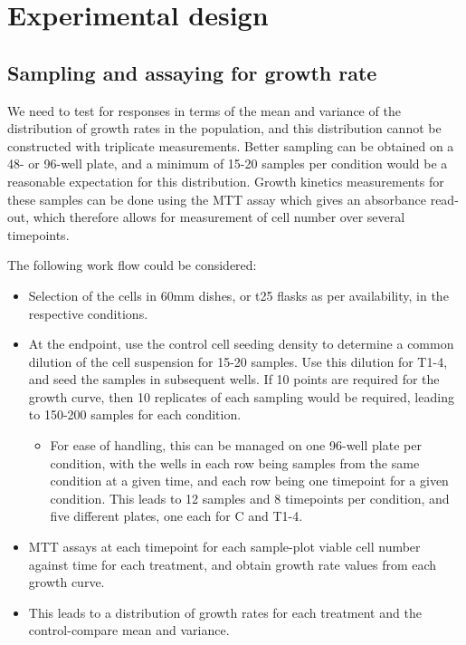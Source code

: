 \documentclass[12pt, letterpaper, onecolumn]{article}
\begin{document}
	\section{Experimental design}
	
	\subsection{Sampling and assaying for growth rate}
	We need to test for responses in terms of the mean and variance of the distribution of growth rates in the population, and this distribution cannot be constructed with triplicate measurements. Better sampling can be obtained on a 48- or 96-well plate, and a minimum of 15-20 samples per condition would be a reasonable expectation for this distribution. Growth kinetics measurements for these samples can be done using the MTT assay which gives an absorbance read-out, which therefore allows for measurement of cell number over several timepoints.
	
	
	The following work flow could be considered:
	\begin{itemize}
		\item Selection of the cells in 60mm dishes, or t25 flasks as per availability, in the respective conditions.
		\item At the endpoint, use the control cell seeding density to determine a common dilution of the cell suspension for 15-20 samples. Use this dilution for T1-4, and seed the samples in subsequent wells. If 10 points are required for the growth curve, then 10 replicates of each sampling would be required, leading to 150-200 samples for each condition.
		\begin{itemize}
			\item For ease of handling, this can be managed on one 96-well plate per condition, with the wells in each row being samples from the same condition at a given time, and each row being one timepoint for a given condition. This leads to 12 samples and 8 timepoints per condition, and five different plates, one each for C and T1-4.
		\end{itemize}
		\item MTT assays at each timepoint for each sample-plot viable cell number against time for each treatment, and obtain growth rate values from each growth curve.
		\item This leads to a distribution of growth rates for each treatment and the control-compare mean and variance.
	\end{itemize}
\end{document}

